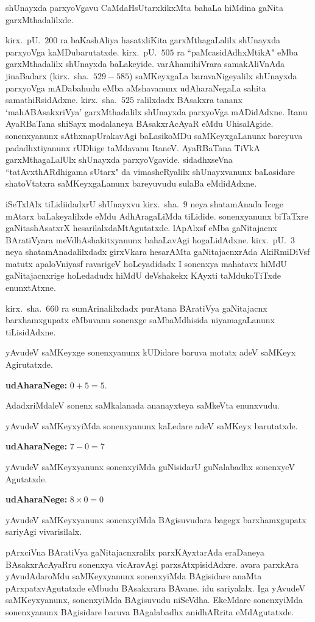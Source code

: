 shUnayxda parxyoVgavu CaMdaHsUtarxkikxMta bahaLa hiMdina gaNita garxMthadalilxde.

kirx.~pU.\ $200$ ra baKashAliya hasatxliKita garxMthagaLalilx shUnayxda parxyoVga kaMDu\-barutatxde. kirx.~pU.\ $505$ ra ``paMcasidAdhxMtikA" eMba garxMthadalilx shUnayxda baLakeyide. varAha\-mihiVrara samakAliVnAda jinaBadarx (kirx.~sha.\ $529-585$) saMKeyxgaLa baravaNige\-yalilx shUnayxda parxyoVga mADabahudu eMba aMshavanunx udAharaNegaLa sahita samathiRsidAdxne. kirx.~sha.\ $525$ ralilxdadx BAsakxra tananx `mahABAsakxriVya' garxMthadalilx shUnayxda parxyoVga mADidAdxne. Itanu AyaRBaTana shiSayx modalaneya BAsakxrAcAyaR eMdu UhisalAgide. sonenxyanunx sAthxnapUrakavAgi baLasikoMDu saMKeyxgaLanunx bareyuva padadhxtiyanunx rUDhige taMdavanu ItaneV. AyaRBaTana TiVkA garxMthagaLalUlx shUnayxda parxyoVgavide. sidadhxseVna ``tatAvxthARdhigama sUtarx" da vimasheRyalilx shUnayx\-vanunx baLasidare shatoVtatxra saMKeyxgaLanunx bareyuvudu sulaBa eMdidAdxne.

iSeTxlAlx tiLidiidadxrU shUnayxvu kirx.~sha.\ $9$ neya shatamAnada Icege mAtarx baLakeyalilxde eMdu AdhAragaLiMda tiLidide. sonenxyanunx biTaTxre gaNitashAsatxrX hesarilalx\-daMtAgutatxde. lApAlxsf eMba gaNitajacnx BAratiVyara meVdhAshakitxyanunx bahaLavAgi hogaLidAdxne. kirx.~pU.\ $3$ neya shatamAnadalilxdadx girxVkara hesarAMta gaNitajacnxrAda AkiRmiDiVsf matutx apaloVniyasf ravarigeV hoLeyadidadx  I sonenxya mahatavx hiMdU \-gaNitajacnxrige hoLedadudx hiMdU deVshakekx KAyxti taMdukoTiTxde enunxtAtxne.

kirx.~sha.\ $660$ ra sumArinalilxdadx purAtana BAratiVya gaNitajacnx barxhamxgupatx eMbuvanu sonenxge saMbaMdhisida niyamagaLanunx tiLisidAdxne.

yAvudeV saMKeyxge sonenxyanunx kUDidare baruva motatx adeV saMKeyx Agirutatxde. 

\textbf{udAharaNege:} $0+5=5$.

AdadxriMdaleV sonenx saMkalanada ananayxteya saMkeVta enunxvudu.

yAvudeV saMKeyxyiMda sonenxyanunx kaLedare adeV saMKeyx barutatxde.

\textbf{udAharaNege:} $7-0=7$

yAvudeV saMKeyxyanunx sonenxyiMda guNisidarU guNalabadhx sonenxyeV Agutatxde. 

\textbf{udAharaNege:} $8\times 0 = 0$

yAvudeV saMKeyxyanunx sonenxyiMda BAgisuvudara bagegx barxhamxgupatx sariyAgi vivarisilalx.

pArxciVna BAratiVya gaNitajacnxralilx parxKAyxtarAda eraDaneya BAsakxrAcAyaRru sonenxya vicAravAgi parxsAtxpisidAdxre. avara parxkAra yAvudAdaroMdu saMKeyx\-yanunx sonenxyiMda BAgisidare anaMta pArxpatxvAgutatxde eMbudu BAsakxrara BAvane. idu sariyalalx. Iga yAvudeV saMKeyxyanunx, sonenxyiMda BAgisuvudu niSeVdha. EkeMdare sonenxyiMda sonenxyanunx BAgisidare baruva BAgalabadhx anidhARrita 
eMdAgutatxde.

